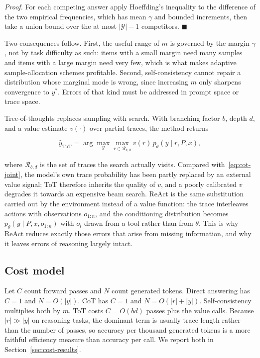\documentclass[conference]{IEEEtran}
\begin{document}
\textit{Proof.} For each competing answer apply Hoeffding's inequality to the difference of the two empirical frequencies, which has mean $\gamma$ and bounded increments, then take a union bound over the at most $|\mathcal{Y}| - 1$ competitors. $\blacksquare$

Two consequences follow. First, the useful range of $m$ is governed by the margin $\gamma$, not by task difficulty as such: items with a small margin need many samples and items with a large margin need very few, which is what makes adaptive sample-allocation schemes profitable. Second, self-consistency cannot repair a distribution whose marginal mode is wrong, since increasing $m$ only sharpens convergence to $y^{*}$. Errors of that kind must be addressed in prompt space or trace space.

Tree-of-thoughts replaces sampling with search. With branching factor $b$, depth $d$, and a value estimate $v(\cdot)$ over partial traces, the method returns

\begin{equation}
\hat{y}_{\mathrm{ToT}} = \arg\max_{y} \max_{r \in \mathcal{R}_{b,d}} v(r) \, p_{\theta}(y \mid r, P, x),
\label{eq:tot}
\end{equation}

where $\mathcal{R}_{b,d}$ is the set of traces the search actually visits. Compared with~\eqref{eq:cot-joint}, the model's own trace probability has been partly replaced by an external value signal; ToT therefore inherits the quality of $v$, and a poorly calibrated $v$ degrades it towards an expensive beam search. ReAct is the same substitution carried out by the environment instead of a value function: the trace interleaves actions with observations $o_{1:n}$, and the conditioning distribution becomes $p_{\theta}(y \mid P, x, o_{1:n})$ with $o_{i}$ drawn from a tool rather than from $\theta$. This is why ReAct reduces exactly those errors that arise from missing information, and why it leaves errors of reasoning largely intact.

\subsection{Cost model}
\label{sec:cost-model}

Let $C$ count forward passes and $N$ count generated tokens. Direct answering has $C = 1$ and $N = O(|y|)$. CoT has $C = 1$ and $N = O(|r| + |y|)$. Self-consistency multiplies both by $m$. ToT costs $C = O(bd)$ passes plus the value calls. Because $|r| \gg |y|$ on reasoning tasks, the dominant term is usually trace length rather than the number of passes, so accuracy per thousand generated tokens is a more faithful efficiency measure than accuracy per call. We report both in Section~\ref{sec:cost-results}.
\end{document}
